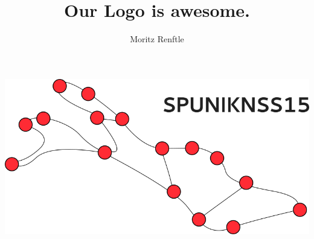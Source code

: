\documentclass[a4paper,11pt]{article}
\title{Our Logo is awesome.}
\author{Moritz Renftle}
\begin{document}
\maketitle

\vspace{20pt}
\begin{minipage}{\linewidth}
  \centering
  \includegraphics[width=\textwidth]{skizze.png}
\end{minipage}

\maketitle
\end{document}
